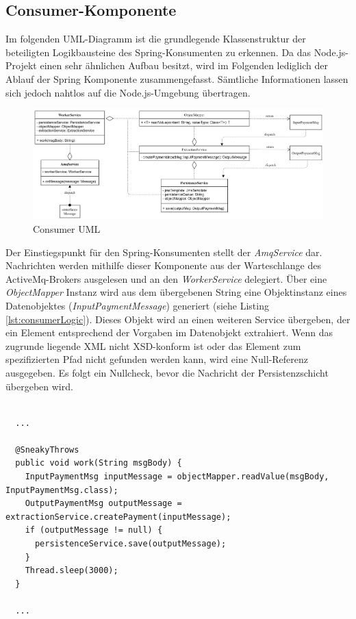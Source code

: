 \newpage

\subsection{Consumer-Komponente}

Im folgenden UML-Diagramm ist die grundlegende Klassenstruktur der beteiligten Logikbausteine des Spring-Konsumenten zu erkennen. Da das Node.js-Projekt einen sehr ähnlichen Aufbau besitzt, wird im Folgenden lediglich der Ablauf der Spring Komponente zusammengefasst. Sämtliche Informationen lassen sich jedoch nahtlos auf die Node.js-Umgebung übertragen. 

\begin{figure}[ht!]
	\centering
	\includegraphics[width=\linewidth]{kapitel/problemloesung/implementierung/_img/consumer-uml}
	\caption[Consumer UML]{Consumer UML}
	\label{fig:consumerUml}
\end{figure}

Der Einstiegspunkt für den Spring-Konsumenten stellt der \emph{AmqService} dar. Nachrichten werden mithilfe dieser Komponente aus der Warteschlange des ActiveMq-Brokers ausgelesen und an den \emph{WorkerService} delegiert. Über eine \emph{ObjectMapper} Instanz wird aus dem übergebenen String eine Objektinstanz eines Datenobjektes (\emph{InputPaymentMessage}) generiert (siehe Listing \ref{lst:consumerLogic}). Dieses Objekt wird an einen weiteren Service übergeben, der ein Element entsprechend der Vorgaben im Datenobjekt extrahiert. Wenn das zugrunde liegende XML nicht XSD-konform ist oder das Element zum spezifizierten Pfad nicht gefunden werden kann, wird eine Null-Referenz ausgegeben. Es folgt ein Nullcheck, bevor die Nachricht der Persistenzschicht übergeben wird.

\begin{lstlisting}[style=javaStyle,caption={WorkerService - Consumer Logik},label=lst:consumerLogic]

  ...

  @SneakyThrows
  public void work(String msgBody) {
    InputPaymentMsg inputMessage = objectMapper.readValue(msgBody, InputPaymentMsg.class);
    OutputPaymentMsg outputMessage = extractionService.createPayment(inputMessage);
    if (outputMessage != null) {
      persistenceService.save(outputMessage);
    }
    Thread.sleep(3000);
  }

  ...

\end{lstlisting}

